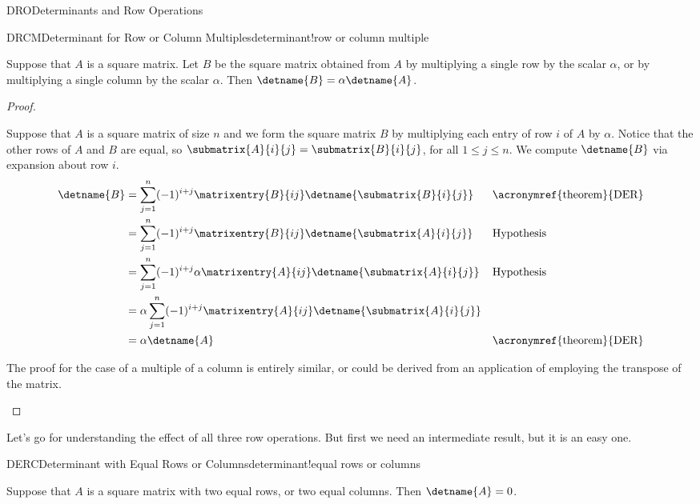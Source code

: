 \begin{subsect}{DRO}{Determinants and Row Operations}
%
\begin{theorem}{DRCM}{Determinant for Row or Column Multiples}{determinant!row or column multiple}
\begin{para}Suppose that $A$ is a square matrix.  Let $B$ be the square matrix obtained from $A$ by multiplying a single row by the scalar $\alpha$, or by multiplying a single column by the scalar $\alpha$.  Then $\detname{B}=\alpha\detname{A}$.\end{para}
\end{theorem}
%
\begin{proof}
\begin{para}Suppose that $A$ is a square matrix of size $n$ and we form the square matrix $B$ by multiplying each entry of row $i$ of $A$ by $\alpha$.  Notice that the other rows of $A$ and $B$ are equal, so $\submatrix{A}{i}{j}=\submatrix{B}{i}{j}$, for all $1\leq j\leq n$.  We compute $\detname{B}$ via expansion about row $i$.
%
\begin{align*}
\detname{B}
&=
\sum_{j=1}^{n}(-1)^{i+j}\matrixentry{B}{ij}\detname{\submatrix{B}{i}{j}}
&&\text{\acronymref{theorem}{DER}}\\
%
&=
\sum_{j=1}^{n}(-1)^{i+j}\matrixentry{B}{ij}\detname{\submatrix{A}{i}{j}}
&&\text{Hypothesis}\\
%
&=
\sum_{j=1}^{n}(-1)^{i+j}\alpha\matrixentry{A}{ij}\detname{\submatrix{A}{i}{j}}
&&\text{Hypothesis}\\
%
&=
\alpha\sum_{j=1}^{n}(-1)^{i+j}\matrixentry{A}{ij}\detname{\submatrix{A}{i}{j}}\\
%
&=
\alpha\detname{A}&&\text{\acronymref{theorem}{DER}}\\
%
\end{align*}
\end{para}
%
\begin{para}The proof for the case of a multiple of a column is entirely similar, or could be derived from an application of  employing the transpose of the matrix.\end{para}
%
\end{proof}
%
\begin{para}Let's go for understanding the effect of all three row operations.  But first we need an intermediate result, but it is an easy one.\end{para}
%
\begin{theorem}{DERC}{Determinant with Equal Rows or Columns}{determinant!equal rows or columns}
\begin{para}Suppose that $A$ is a square matrix with two equal rows, or two equal columns.  Then $\detname{A}=0$.\end{para}

\end{theorem}
\end{subsect}
